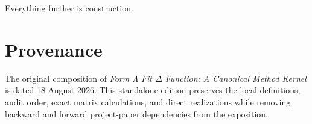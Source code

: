 \documentclass[11pt]{article}
\begin{document}
Everything further is construction.

\section*{Provenance}

The original composition of \emph{Form $\Lambda$ Fit $\Delta$ Function: A Canonical Method Kernel} is dated 18 August 2026. This standalone edition preserves the local definitions, audit order, exact matrix calculations, and direct realizations while removing backward and forward project-paper dependencies from the exposition.
\end{document}
